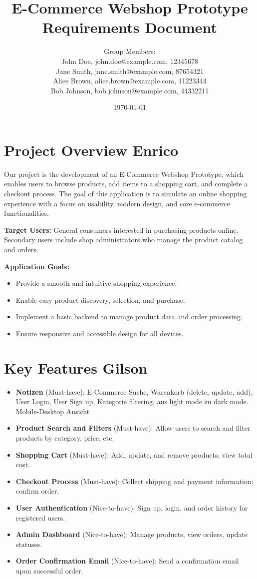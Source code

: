 \documentclass[a4paper,12pt]{article}
\title{E-Commerce Webshop Prototype \\
	Requirements Document}
\author{
	Group Members: \\
	John Doe, john.doe@example.com, 12345678 \\
	Jane Smith, jane.smith@example.com, 87654321 \\
	Alice Brown, alice.brown@example.com, 11223344 \\
	Bob Johnson, bob.johnson@example.com, 44332211
}
\date{\today}
\begin{document}
	
	\maketitle
	
	\section{Project Overview Enrico}
	Our project is the development of an E-Commerce Webshop Prototype, which enables users to browse products, add items to a shopping cart, and complete a checkout process. The goal of this application is to simulate an online shopping experience with a focus on usability, modern design, and core e-commerce functionalities.
	
	\textbf{Target Users:}  
	General consumers interested in purchasing products online. Secondary users include shop administrators who manage the product catalog and orders.
	
	\textbf{Application Goals:}
	\begin{itemize}
		\item Provide a smooth and intuitive shopping experience.
		\item Enable easy product discovery, selection, and purchase.
		\item Implement a basic backend to manage product data and order processing.
		\item Ensure responsive and accessible design for all devices.
	\end{itemize}
	
	\section{Key Features Gilson}
	\begin{itemize}
		\item \textbf{Notizen} (Must-have): E-Commerce
		Suche, Warenkorb (delete, update, add), User Login, User Sign up, Kategorie filtering, aus light mode zu dark mode. Mobile-Desktop Ansicht
		\item \textbf{Product Search and Filters} (Must-have): Allow users to search and filter products by category, price, etc.
		\item \textbf{Shopping Cart} (Must-have): Add, update, and remove products; view total cost.
		\item \textbf{Checkout Process} (Must-have): Collect shipping and payment information; confirm order.
		\item \textbf{User Authentication} (Nice-to-have): Sign up, login, and order history for registered users.
		\item \textbf{Admin Dashboard} (Nice-to-have): Manage products, view orders, update statuses.
		\item \textbf{Order Confirmation Email} (Nice-to-have): Send a confirmation email upon successful order.
	\end{itemize}
	
\end{document}
